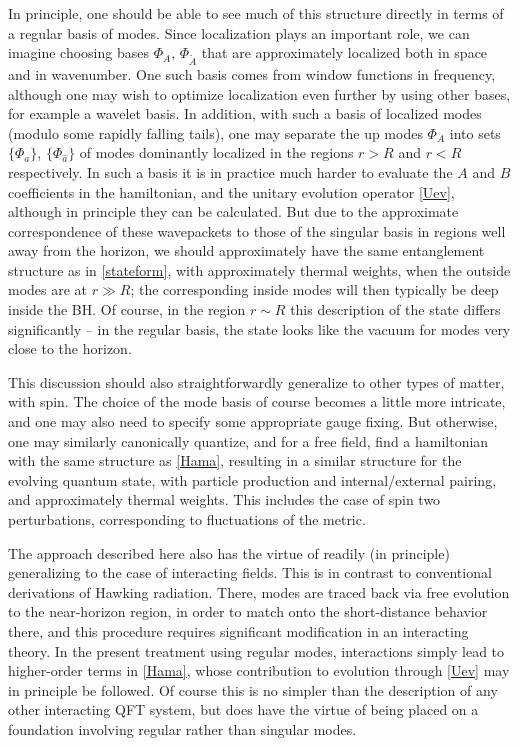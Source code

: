 \documentclass[11pt]{article}
\numberwithin{equation}{section}
\newcommand{\tA}{{\tilde A}}
\begin{document}
In principle, one should be able to see much of this structure directly in terms of a regular basis of modes.  Since localization plays an important role, we can imagine choosing bases $\Phi_A$, $\Phi_\tA$ that are approximately localized both in space and in wavenumber.  One such basis comes from window functions in frequency\cite{Hawk,GiNe}, although one may wish to optimize localization even further by using other bases, for example a wavelet basis.  In addition, with such a basis of localized modes (modulo some rapidly falling tails), one may separate the up modes $\Phi_A$ into sets $\{\Phi_a\}$, $\{\Phi_{\hat a}\}$ of modes dominantly localized in the regions $r>R$ and $r<R$ respectively.  In such a basis it is in practice much harder to evaluate the $A$ and $B$ coefficients in the hamiltonian, and the unitary evolution operator \eqref{Uev}, although in principle they can be calculated.  But due to the approximate correspondence of these wavepackets to those of the singular basis in regions well away from the horizon, we should approximately have the same entanglement structure as in \eqref{stateform}, with approximately thermal weights, when the outside modes are at $r\gg R$; the corresponding inside modes will then typically be deep inside the BH.  Of course, in the region $r\sim R$ this description of the state differs significantly -- in the regular basis, the state looks like the vacuum for modes very close to the horizon\cite{SEHS,SE2d}.

This discussion should also straightforwardly generalize to other types of matter, with spin.  The choice of the mode basis of course becomes a little more intricate, and one may also need to specify some appropriate gauge fixing.  But otherwise, one may similarly canonically quantize, and for a free field, find a hamiltonian with the same structure as \eqref{Hama}, resulting in a similar structure for the evolving quantum state, with particle production and internal/external pairing, and approximately thermal weights.  This includes the case of spin two perturbations, corresponding to fluctuations of the metric.

The approach described here also has the virtue of readily (in principle) generalizing to the case of interacting fields.  This is in contrast to conventional derivations of Hawking radiation.  There, modes are traced back via free evolution to the near-horizon region, in order to match onto the short-distance behavior there, and this procedure requires significant modification in an interacting theory.  In the present treatment using regular modes, interactions simply lead to higher-order terms in \eqref{Hama}, whose contribution to evolution through \eqref{Uev} may in principle be followed.  Of course this is no simpler than the description of any other interacting QFT system, but does have the virtue of being placed on a foundation involving regular rather than singular modes.
\end{document}
